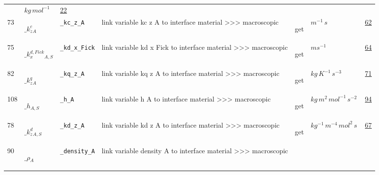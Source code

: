 \begin{longtable}{|p{1cm}|p{2.5cm}|p{4.5cm}|p{8cm}|p{3.0cm}|p{3cm}|p{1cm}|}
             & $ kg \,mol^{-1} \, $
             &                 \hyperlink{"e:22"}{ 22 }
                 \\
            73
             & \hypertarget{"v:73"}{ $ {{\_k^c_z}}{_{A}} $}
             & \verb|_kc_z_A|
             & link variable kc z A to interface material >>> macroscopic
             & \begin{lay}get \end{lay}
             & $ m^{-1} \,s \, $
             &                 \hyperlink{"e:62"}{ 62 }
                 \\
            75
             & \hypertarget{"v:75"}{ $ {{\_k^{d,Fick}_x}}{_{A, S}} $}
             & \verb|_kd_x_Fick|
             & link variable kd x Fick to interface material >>> macroscopic
             & \begin{lay}get \end{lay}
             & $ m s^{-1} \, $
             &                 \hyperlink{"e:64"}{ 64 }
                 \\
            82
             & \hypertarget{"v:82"}{ $ {{\_k^q_z}}{_{A}} $}
             & \verb|_kq_z_A|
             & link variable kq z A to interface material >>> macroscopic
             & \begin{lay}get \end{lay}
             & $ kg \,K^{-1} \,s^{-3} \, $
             &                 \hyperlink{"e:71"}{ 71 }
                 \\
            108
             & \hypertarget{"v:108"}{ $ {{\_h}}{_{A, S}} $}
             & \verb|_h_A|
             & link variable h A to interface material >>> macroscopic
             & \begin{lay}get \end{lay}
             & $ kg \,m^{2} \,mol^{-1} \,s^{-2} \, $
             &                 \hyperlink{"e:94"}{ 94 }
                 \\
            78
             & \hypertarget{"v:78"}{ $ {{\_k^d_z}}{_{A, S}} $}
             & \verb|_kd_z_A|
             & link variable kd z A to interface material >>> macroscopic
             & \begin{lay}get \end{lay}
             & $ kg^{-1} \,m^{-4} \,mol^{2} \,s \, $
             &                 \hyperlink{"e:67"}{ 67 }
                 \\
            90
             & \hypertarget{"v:90"}{ $ {{\_\rho}}{_{A}} $}
             & \verb|_density_A|
             & link variable density A to interface material >>> macroscopic

\end{longtable}
